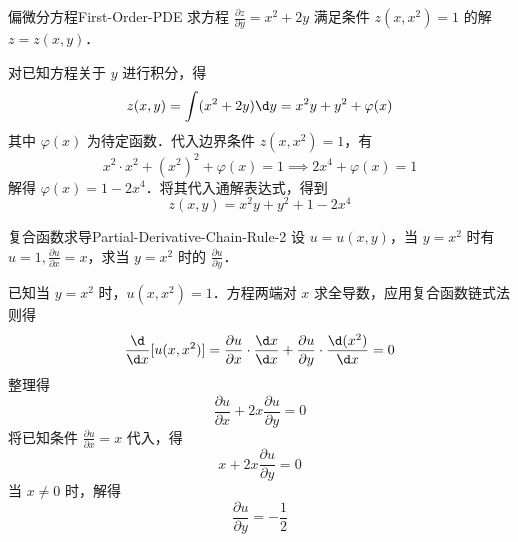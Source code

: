 \begin{problem}{偏微分方程}{First-Order-PDE}
    求方程 $\frac{\partial z}{\partial y} = x^2 + 2y$ 满足条件 $z(x, x^2) = 1$ 的解 $z = z(x, y)$．
\end{problem}

\begin{solution}
    对已知方程关于 $y$ 进行积分，得
    \begin{equation}
        z(x, y) = \int (x^2 + 2y) \d y = x^2 y + y^2 + \varphi(x)
    \end{equation}
    其中 $\varphi(x)$ 为待定函数．代入边界条件 $z(x, x^2) = 1$，有
    \begin{equation}
        x^2 \cdot x^2 + (x^2)^2 + \varphi(x) = 1 \implies 2x^4 + \varphi(x) = 1
    \end{equation}
    解得 $\varphi(x) = 1 - 2x^4$．将其代入通解表达式，得到
    \begin{equation}
        \boxed{z(x, y) = x^2 y + y^2 + 1 - 2x^4}
    \end{equation}
\end{solution}


\begin{problem}{复合函数求导}{Partial-Derivative-Chain-Rule-2}
    设 $u = u(x, y)$，当 $y = x^2$ 时有 $u = 1, \frac{\partial u}{\partial x} = x$，求当 $y = x^2$ 时的 $\frac{\partial u}{\partial y}$．
\end{problem}

\begin{solution}
    已知当 $y = x^2$ 时，$u(x, x^2) = 1$．方程两端对 $x$ 求全导数，应用复合函数链式法则得
    \begin{equation}
        \frac{\d}{\d x} [u(x, x^2)] = \frac{\partial u}{\partial x} \cdot \frac{\d x}{\d x} + \frac{\partial u}{\partial y} \cdot \frac{\d (x^2)}{\d x} = 0
    \end{equation}
    整理得
    \begin{equation}
        \frac{\partial u}{\partial x} + 2x \frac{\partial u}{\partial y} = 0
    \end{equation}
    将已知条件 $\frac{\partial u}{\partial x} = x$ 代入，得
    \begin{equation}
        x + 2x \frac{\partial u}{\partial y} = 0
    \end{equation}
    当 $x \neq 0$ 时，解得
    \begin{equation}
        \boxed{\frac{\partial u}{\partial y} = -\frac{1}{2}}
    \end{equation}
\end{solution}



